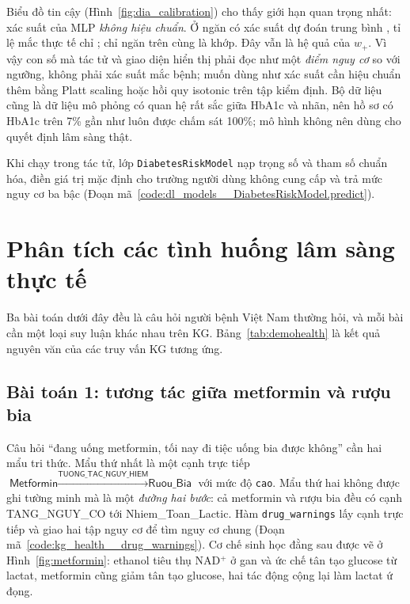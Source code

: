 
Biểu đồ tin cậy (Hình~\ref{fig:dia_calibration}) cho thấy giới hạn quan trọng nhất: xác suất của MLP \emph{không
hiệu chuẩn}. Ở ngăn có xác suất dự đoán trung bình , tỉ lệ mắc thực tế chỉ
; chỉ ngăn trên cùng là khớp. Đây vẫn là hệ quả của $w_+$. Vì vậy con số mà tác tử
và giao diện hiển thị phải đọc như một \emph{điểm nguy cơ} so với ngưỡng, không phải xác suất mắc bệnh; muốn dùng
như xác suất cần hiệu chuẩn thêm bằng Platt scaling hoặc hồi quy isotonic trên tập kiểm định. Bộ dữ liệu cũng là
dữ liệu mô phỏng có quan hệ rất sắc giữa HbA1c và nhãn, nên hồ sơ có HbA1c trên 7\% gần như luôn được chấm sát
100\%; mô hình không nên dùng cho quyết định lâm sàng thật.


Khi chạy trong tác tử, lớp \texttt{DiabetesRiskModel} nạp trọng số và tham số chuẩn hóa, điền giá trị mặc định
cho trường người dùng không cung cấp và trả mức nguy cơ ba bậc (Đoạn mã~\ref{code:dl_models__DiabetesRiskModel.predict}).


\section{Phân tích các tình huống lâm sàng thực tế}
Ba bài toán dưới đây đều là câu hỏi người bệnh Việt Nam thường hỏi, và mỗi bài cần một loại suy luận khác nhau
trên KG. Bảng~\ref{tab:demohealth} là kết quả nguyên văn của các truy vấn KG tương ứng.


\subsection{Bài toán 1: tương tác giữa metformin và rượu bia}
Câu hỏi ``đang uống metformin, tối nay đi tiệc uống bia được không'' cần hai mẩu tri thức. Mẩu thứ nhất là một
cạnh trực tiếp $\textsf{Metformin} \xrightarrow{\textsf{TUONG\_TAC\_NGUY\_HIEM}} \textsf{Ruou\_Bia}$ với mức độ
\texttt{cao}. Mẩu thứ hai không được ghi tường minh mà là một \emph{đường hai bước}: cả metformin và rượu bia đều có
cạnh \textsf{TANG\_NGUY\_CO} tới \textsf{Nhiem\_Toan\_Lactic}. Hàm \texttt{drug\_warnings} lấy cạnh trực tiếp và
giao hai tập nguy cơ để tìm nguy cơ chung (Đoạn mã~\ref{code:kg_health__drug_warnings}). Cơ chế sinh học đằng sau
được vẽ ở Hình~\ref{fig:metformin}: ethanol tiêu thụ NAD$^+$ ở gan và ức chế tân tạo glucose từ lactat, metformin
cũng giảm tân tạo glucose, hai tác động cộng lại làm lactat ứ đọng.

